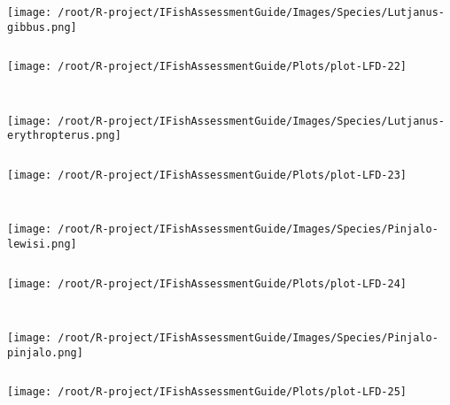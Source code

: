 \documentclass{report}\usepackage[]{graphicx}\usepackage[]{color}
\makeatletter
\def\maxwidth{ %
  \ifdim\Gin@nat@width>\linewidth
    \linewidth
  \else
    \Gin@nat@width
  \fi
}
\newenvironment{kframe}{%
 \def\at@end@of@kframe{}%
 \ifinner\ifhmode%
  \def\at@end@of@kframe{\end{minipage}}%
  \begin{minipage}{\columnwidth}%
 \fi\fi%
 \def\FrameCommand##1{\hskip\@totalleftmargin \hskip-\fboxsep
 \colorbox{shadecolor}{##1}\hskip-\fboxsep
     \hskip-\linewidth \hskip-\@totalleftmargin \hskip\columnwidth}%
 \MakeFramed {\advance\hsize-\width
   \@totalleftmargin\z@ \linewidth\hsize
   \@setminipage}}%
 {\par\unskip\endMakeFramed%
 \at@end@of@kframe}
\newenvironment{knitrout}{}{} %
\makeatother
\begin{document}
\begin{knitrout}
\begin{kframe}
\begin{verbatim}
\end{verbatim}
\end{kframe}
\texttt{[image: /root/R-project/IFishAssessmentGuide/Images/Species/Lutjanus-gibbus.png]}
\begin{kframe}\begin{verbatim}
\end{verbatim}
\end{kframe}
\texttt{[image: /root/R-project/IFishAssessmentGuide/Plots/plot-LFD-22]} 
\begin{kframe}\begin{verbatim}
 
\end{verbatim}
\end{kframe}
\texttt{[image: /root/R-project/IFishAssessmentGuide/Images/Species/Lutjanus-erythropterus.png]}
\begin{kframe}\begin{verbatim}
\end{verbatim}
\end{kframe}
\texttt{[image: /root/R-project/IFishAssessmentGuide/Plots/plot-LFD-23]} 
\begin{kframe}\begin{verbatim}
 
\end{verbatim}
\end{kframe}
\texttt{[image: /root/R-project/IFishAssessmentGuide/Images/Species/Pinjalo-lewisi.png]}
\begin{kframe}\begin{verbatim}
\end{verbatim}
\end{kframe}
\texttt{[image: /root/R-project/IFishAssessmentGuide/Plots/plot-LFD-24]} 
\begin{kframe}\begin{verbatim}
 
\end{verbatim}
\end{kframe}
\texttt{[image: /root/R-project/IFishAssessmentGuide/Images/Species/Pinjalo-pinjalo.png]}
\begin{kframe}\begin{verbatim}
\end{verbatim}
\end{kframe}
\texttt{[image: /root/R-project/IFishAssessmentGuide/Plots/plot-LFD-25]} 
\begin{kframe}\begin{verbatim}
 

\end{verbatim}
\end{kframe}
\end{knitrout}
\end{document}
